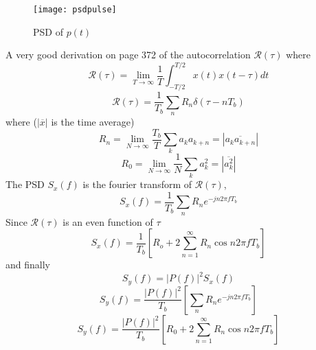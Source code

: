 \documentclass{article}
\begin{document}
    \begin{figure}[h]
        \centering
        \texttt{[image: psdpulse]}
        \caption{PSD of $p(t)$}
    \end{figure}
    A very good derivation on page 372 of the autocorrelation $\mathcal{R}(\tau)$ where 
    \begin{equation}
        \mathcal{R}(\tau) = \lim_{T \rightarrow \infty}\frac{1}{T}\int_{-T/2}^{T/2}x(t)x(t-\tau)dt
    \end{equation}
    \begin{equation}
        \mathcal{R}(\tau) = \frac{1}{T_b}\sum_n R_n \delta(\tau-nT_b)
    \end{equation}
    where ($|\overline{x}|$ is the time average)
    \begin{equation}
        R_n = \lim_{N \rightarrow \infty} \frac{T_b}{T} \sum_k a_ka_{k+n} = |\overline{a_ka_{k+n}}|
    \end{equation}
    \begin{equation}
        R_0 = \lim_{N\rightarrow \infty} \frac{1}{N}\sum_k a_k^2 = |\overline{a_k^2}|
    \end{equation}
    The PSD $S_x(f)$ is the fourier transform of $\mathcal{R}(\tau)$,
    \begin{equation}
        S_x(f) = \frac{1}{T_b}\sum_n R_ne^{-jn2\pi fT_b}
    \end{equation}
    Since $\mathcal{R}(\tau)$ is an even function of $\tau$
    \begin{equation}
        S_x(f) = \frac{1}{T_b}[R_o + 2 \sum_{n=1}^{\infty}R_n \cos n2\pi fT_b]
    \end{equation}
    and finally
    \begin{equation}
        S_y(f) = |P(f)|^2S_x(f) 
    \end{equation}
    \begin{equation}
        S_y(f) = \frac{|P(f)|^2}{T_b}[\sum_n R_n e^{-jn2\pi fT_b}]
    \end{equation}
    \begin{equation}
        S_y(f) =  \frac{|P(f)|^2}{T_b}[R_0 + 2 \sum_{n=1}^{\infty}R_n \cos n2\pi fT_b]
    \end{equation}
\end{document}
